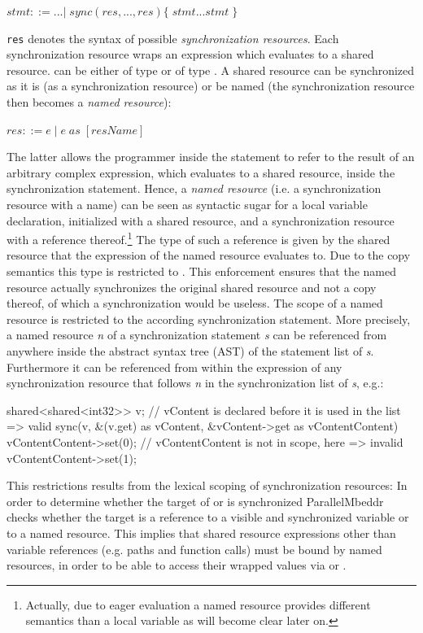 $ \mathit{stmt} ::= ...
        |\;\mathit{sync}(res, ..., res) \{\;\mathit{stmt} ... \mathit{stmt}\;\}$
        
\texttt{res} denotes the syntax of possible \textit{synchronization resources}. Each synchronization resource  wraps an expression  which evaluates to a shared resource.  can be either of type  or of type . A shared resource can be synchronized as it is (as a synchronization resource) or be named (the synchronization resource then becomes a \textit{named resource}):

$ res ::= e\;|\;e\;\mathit{as}\;[\mathit{resName}] $

The latter allows the programmer inside the  statement to refer to the result of an arbitrary complex expression, which evaluates to a shared resource, inside the synchronization statement. Hence, a \textit{named resource} (i.e. a synchronization resource with a name) can be seen as syntactic sugar for a local variable declaration, initialized with a shared resource, and a synchronization resource with a reference thereof.\footnote{Actually, due to eager evaluation a named resource provides different semantics than a local variable as will become clear later on.} The type of such a reference is given by the shared resource that the expression of the named resource evaluates to. Due to the copy semantics this type is restricted to . This enforcement ensures that the named resource actually synchronizes the original shared resource and not a copy thereof, of which a synchronization would be useless. The scope of a named resource is restricted to the according synchronization statement. More precisely, a named resource \textit{n} of a synchronization statement \textit{s} can be referenced from anywhere inside the abstract syntax tree (AST) of the statement list of \textit{s}. Furthermore it can be referenced from within the expression of any synchronization resource that follows \textit{n} in the synchronization list of \textit{s}, e.g.:
\begin{ccode}
shared<shared<int32>> v;
// vContent is declared before it is used in the list => valid
sync(v, &(v.get) as vContent, &vContent->get as vContentContent) {
  vContentContent->set(0);
}
// vContentContent is not in scope, here => invalid
vContentContent->set(1);
\end{ccode}

This restrictions results from the lexical scoping of synchronization resources: In order to determine whether the target of  or  is synchronized ParallelMbeddr checks whether the target is a reference to a visible and synchronized variable or to a named resource. This implies that shared resource expressions other than variable references (e.g. paths and function calls) must be bound by named resources, in order to be able to access their wrapped values via  or . 

